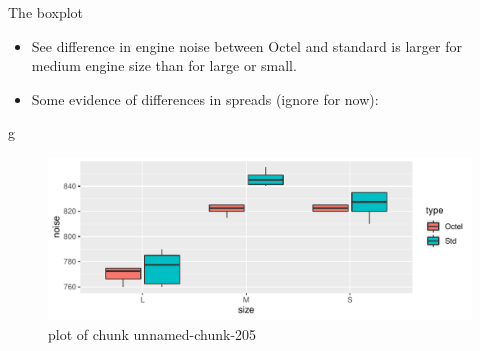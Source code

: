 \documentclass[ignorenonframetext,]{beamer}
\newenvironment{Shaded}{\begin{snugshade}}{\end{snugshade}}
\newcommand{\NormalTok}[1]{#1}
\begin{document}
\begin{frame}[fragile]{The boxplot}
\protect\hypertarget{the-boxplot}{}

\begin{itemize}
\item
  See difference in engine noise between Octel and standard is larger
  for medium engine size than for large or small.
\item
  Some evidence of differences in spreads (ignore for now):
\end{itemize}

\begin{Shaded}
\begin{Highlighting}[]
\NormalTok{g}
\end{Highlighting}
\end{Shaded}

\begin{figure}
\centering
\includegraphics{figure/unnamed-chunk-205-1.pdf}
\caption{plot of chunk unnamed-chunk-205}
\end{figure}

\end{frame}
\end{document}
